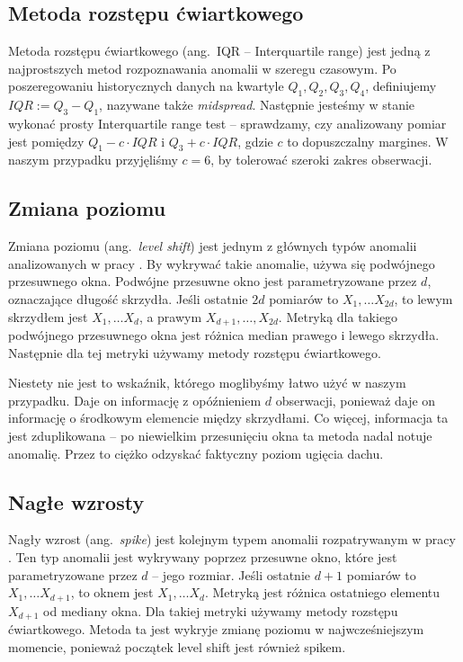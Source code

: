 \subsection{Metoda rozstępu ćwiartkowego}
Metoda rozstępu ćwiartkowego (ang.\ IQR -- Interquartile range) jest jedną z najprostszych metod rozpoznawania anomalii w szeregu czasowym.
Po poszeregowaniu historycznych danych na kwartyle $Q_1, Q_2, Q_3, Q_4$, definiujemy $\mathit{IQR}:= Q_3 - Q_1$, nazywane także \emph{midspread}.
Następnie jesteśmy w stanie wykonać prosty Interquartile range test -- sprawdzamy, czy analizowany pomiar jest pomiędzy $Q_1 - c \cdot \mathit{IQR}$ i $Q_3 + c \cdot \mathit{IQR}$, gdzie $c$ to dopuszczalny margines.
W naszym przypadku przyjęliśmy $c=6$, by tolerować szeroki zakres obserwacji.

\subsection{Zmiana poziomu}\label{levelshift}
Zmiana poziomu (ang.\ \emph{level shift}) jest jednym z głównych typów anomalii analizowanych w pracy \cite{https://doi.org/10.1002/for.3980070102}.
By wykrywać takie anomalie, używa się podwójnego przesuwnego okna.
Podwójne przesuwne okno jest parametryzowane przez $d$, oznaczające długość skrzydła.
Jeśli ostatnie $2d$ pomiarów to $X_1, \ldots X_{2d}$, to lewym skrzydłem jest $X_1, \ldots X_d$, a prawym $X_{d + 1}, \ldots, X_{2d}$.
Metryką dla takiego podwójnego przesuwnego okna jest różnica median prawego i lewego skrzydła.
Następnie dla tej metryki używamy metody rozstępu ćwiartkowego.

Niestety nie jest to wskaźnik, którego moglibyśmy łatwo użyć w naszym przypadku.
Daje on informację z opóźnieniem $d$ obserwacji, ponieważ daje on informację o środkowym elemencie między skrzydłami.
Co więcej, informacja ta jest zduplikowana -- po niewielkim przesunięciu okna ta metoda nadal notuje anomalię.
Przez to ciężko odzyskać faktyczny poziom ugięcia dachu.

\subsection{Nagłe wzrosty}\label{spike}
Nagły wzrost (ang.\ \emph{spike}) jest kolejnym typem anomalii rozpatrywanym w pracy \cite{https://doi.org/10.1002/for.3980070102}.
Ten typ anomalii jest wykrywany poprzez przesuwne okno, które jest parametryzowane przez $d$ -- jego rozmiar.
Jeśli ostatnie $d + 1$ pomiarów to $X_1, \ldots X_{d + 1}$, to oknem jest $X_1, \ldots X_d$. Metryką jest różnica ostatniego elementu $X_{d+1}$ od mediany okna. Dla takiej metryki używamy metody rozstępu ćwiartkowego.
Metoda ta jest wykryje zmianę poziomu w najwcześniejszym momencie, ponieważ początek level shift jest również spikem.

